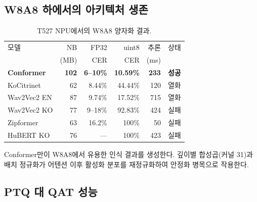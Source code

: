 \documentclass[a4paper,11pt,twocolumn]{article}
\begin{document}
\subsection{W8A8 하에서의 아키텍처 생존}

\begin{table}[t]
\centering
\caption{T527 NPU에서의 W8A8 양자화 결과.}
\small
\begin{tabular}{@{}lrrrrr@{}}
\toprule
모델 & NB & FP32 & uint8 & 추론 & 상태 \\
 & (MB) & CER & CER & (ms) & \\
\midrule
\textbf{Conformer} & \textbf{102} & \textbf{6--10\%} & \textbf{10.59\%} & \textbf{233} & \textbf{성공} \\
KoCitrinet & 62 & 8.44\% & 44.44\% & 120 & 열화 \\
Wav2Vec2 EN & 87 & 9.74\% & 17.52\% & 715 & 열화 \\
Wav2Vec2 KO & 77 & 9--18\% & 92.83\% & 424 & 실패 \\
Zipformer & 63 & 16.2\% & 100\% & 50 & 실패 \\
HuBERT KO & 76 & --- & 100\% & 423 & 실패 \\
\bottomrule
\end{tabular}
\end{table}

Conformer만이 W8A8에서 유용한 인식 결과를 생성한다. 깊이별 합성곱(커널 31)과 배치 정규화가 어텐션 이후 활성화 분포를 재정규화하여 안정화 병목으로 작용한다.

\subsection{PTQ 대 QAT 성능}
\end{document}
